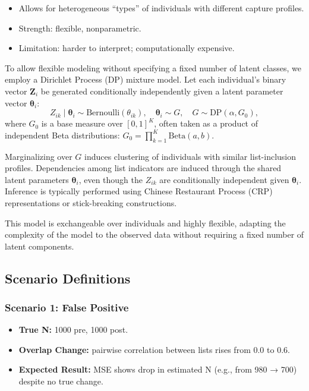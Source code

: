 \documentclass[
  12pt,
]{article}
\providecommand{\tightlist}{%
  \setlength{\itemsep}{0pt}\setlength{\parskip}{0pt}}\usepackage{longtable,booktabs,array}
\theoremstyle{plain}
\theoremstyle{definition}
\begin{document}
\begin{itemize}
\tightlist
\item
  Allows for heterogeneous ``types'' of individuals with different
  capture profiles.
\item
  Strength: flexible, nonparametric.
\item
  Limitation: harder to interpret; computationally expensive.
\end{itemize}

To allow flexible modeling without specifying a fixed number of latent
classes, we employ a Dirichlet Process (DP) mixture model. Let each
individual's binary vector \(\mathbf{Z}_i\) be generated conditionally
independently given a latent parameter vector \(\boldsymbol{\theta}_i\):
\[
Z_{ik} \mid \boldsymbol{\theta}_i \sim \text{Bernoulli}(\theta_{ik}), \quad \boldsymbol{\theta}_i \sim G, \quad G \sim \text{DP}(\alpha, G_0),
\] where \(G_0\) is a base measure over \([0,1]^K\), often taken as a
product of independent Beta distributions:
\(G_0 = \prod_{k=1}^K \text{Beta}(a, b)\).

Marginalizing over \(G\) induces clustering of individuals with similar
list-inclusion profiles. Dependencies among list indicators are induced
through the shared latent parameters \(\boldsymbol{\theta}_i\), even
though the \(Z_{ik}\) are conditionally independent given
\(\boldsymbol{\theta}_i\). Inference is typically performed using
Chinese Restaurant Process (CRP) representations or stick-breaking
constructions.

This model is exchangeable over individuals and highly flexible,
adapting the complexity of the model to the observed data without
requiring a fixed number of latent components.

\subsection{Scenario Definitions}\label{scenario-definitions}

\subsubsection{Scenario 1: False
Positive}\label{scenario-1-false-positive}

\begin{itemize}
\tightlist
\item
  \textbf{True N:} 1000 pre, 1000 post.\\
\item
  \textbf{Overlap Change:} pairwise correlation between lists rises from
  0.0 to 0.6.\\
\item
  \textbf{Expected Result:} MSE shows drop in estimated N (e.g., from
  980 → 700) despite no true change.
\end{itemize}
\end{document}
